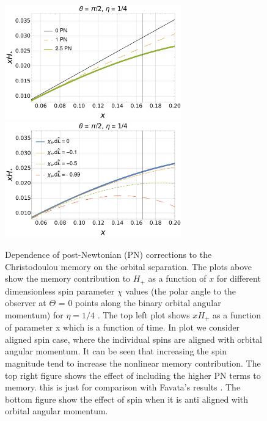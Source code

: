 \documentclass[twocolumn,showpacs,aps,prd,nobibnotes,floatfix]{revtex4-1}
\begin{document}
\begin{widetext}
\begin{figure}
	\includegraphics[width=3.0in]{../plots/PNmemoryFavata.pdf}
	\includegraphics[width=3.0in]{../plots/PNmemorycontributionHpAntiAlginedSpin.pdf}
	\caption{Dependence of post-Newtonian (PN) corrections to the Christodoulou memory on the orbital separation. The plots above show the memory contribution to $H_+$  as a function of $x$ for different dimensionless spin parameter $\chi$ values (the polar angle to the observer at $\Theta$ = 0 points along the binary orbital angular momentum) for $\eta=1/4 $ . The top left plot shows $x H_+$ as a function of parameter x which is a function of time. In plot we consider aligned spin case, where the individual spins are aligned with orbital angular momentum. It can be seen that increasing the spin magnitude tend to increase the nonlinear memory contribution. The top right figure shows the effect of including the higher PN terms to memory. this is just for comparison with Favata's results \cite{Favata2009}. The bottom figure show the effect of spin when it is anti aligned with orbital angular momentum.   
		}
	\label{fig:HpVsX}
\end{figure}
\end{widetext}
\end{document}
